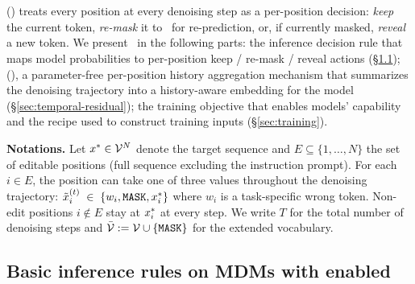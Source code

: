 \section{\methodfull}
\label{sec:method}

\methodfull (\method) treats every position at every denoising step as a per-position decision: \emph{keep} the current token, \emph{re-mask} it to \mask\ for re-prediction, or, if currently masked, \emph{reveal} a new token. We present \method\ in the following parts: the inference decision rule that maps model probabilities to per-position keep / re-mask / reveal actions (\S\ref{sec:inference}); 
\temporalmethodfull (\temporalmethod), a parameter-free per-position history aggregation mechanism that summarizes the denoising trajectory into a history-aware embedding for the model (\S\ref{sec:temporal-residual});
the training objective that enables models' \methodfull capability and the recipe used to construct training inputs (\S\ref{sec:training}).



\textbf{Notations.} Let $x^{\ast} \in \mathcal{V}^N$ denote the target sequence and $E \subseteq \{1, \ldots, N\}$ the set of editable positions  (full sequence excluding the instruction prompt). For each $i \in E$, the position can take one of three values throughout the denoising trajectory:
$\tilde{x}^{(t)}_i \;\in\; \{w_i, \texttt{MASK}, x^{\ast}_i\}$
where $w_i$ is a task-specific wrong token. Non-edit positions $i \notin E$ stay at $x^{\ast}_i$ at every step. We write $T$ for the total number of denoising steps and $\bar{\mathcal{V}} := \mathcal{V} \cup \{\texttt{MASK}\}$ for the extended vocabulary.



\subsection{Basic inference rules on MDMs with \methodfull enabled}
\label{sec:inference}



